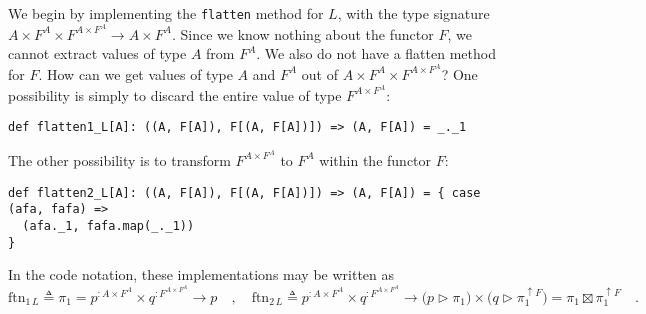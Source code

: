 We begin by implementing the \lstinline!flatten! method for $L$,
with the type signature $A\times F^{A}\times F^{A\times F^{A}}\rightarrow A\times F^{A}$.
Since we know nothing about the functor $F$, we cannot extract values
of type $A$ from $F^{A}$. We also do not have a flatten method for
$F$. How can we get values of type $A$ and $F^{A}$ out of $A\times F^{A}\times F^{A\times F^{A}}$?
One possibility is simply to discard the entire value of type $F^{A\times F^{A}}$:
\begin{lstlisting}
def flatten1_L[A]: ((A, F[A]), F[(A, F[A])]) => (A, F[A]) = _._1
\end{lstlisting}
The other possibility is to transform $F^{A\times F^{A}}$ to $F^{A}$
within the functor $F$:
\begin{lstlisting}
def flatten2_L[A]: ((A, F[A]), F[(A, F[A])]) => (A, F[A]) = { case (afa, fafa) =>
  (afa._1, fafa.map(_._1))
}
\end{lstlisting}
In the code notation, these implementations may be written as
\[
\text{ftn}_{1\,L}\triangleq\pi_{1}=p^{:A\times F^{A}}\times q^{:F^{A\times F^{A}}}\rightarrow p\quad,\quad\text{ftn}_{2\,L}\triangleq p^{:A\times F^{A}}\times q^{:F^{A\times F^{A}}}\rightarrow\big(p\triangleright\pi_{1}\big)\times\big(q\triangleright\pi_{1}^{\uparrow F}\big)=\pi_{1}\boxtimes\pi_{1}^{\uparrow F}\quad.
\]

